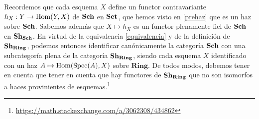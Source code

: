 \documentclass[twoside]{article}
\begin{document}
Recordemos que cada esquema $X$ define un functor contravariante $h_X:Y\to\operatorname{Hom}(Y,X)$ de $\mathrm{\mathbf{Sch}}$ en $\mathrm{\mathbf{Set}}$, que hemos visto en \ref{prehaz} que es un haz sobre $\mathrm{\mathbf{Sch}}$. Sabemos además que $X\mapsto h_X$ es un functor plenamente fiel de $\mathrm{\mathbf{Sch}}$ en $\mathrm{\mathbf{Sh}}_{\mathrm{\mathbf{Sch}}}$. En virtud de la equivalencia \ref{equivalencia} y de la definición de $\mathrm{\mathbf{Sh}}_{\mathrm{\mathbf{Ring}}}$, podemos entonces identificar canónicamente la categoría $\mathrm{\mathbf{Sch}}$ con una subcategoría plena de la categoría $\mathrm{\mathbf{Sh}}_{\mathrm{\mathbf{Ring}}}$, siendo cada esquema $X$ identificado con un haz $A\mapsto \operatorname{Hom}(\operatorname{Spec}(A),X)$ sobre $\mathrm{\mathbf{Ring}}$.  De todos modos, debemos tener en cuenta que tener en cuenta que hay functores de $\mathrm{\mathbf{Sh}}_{\mathrm{\mathbf{Ring}}}$ que no son isomorfos a haces provinientes de esquemas.\footnote{\url{https://math.stackexchange.com/a/3062308/434862}} %
\end{document}
